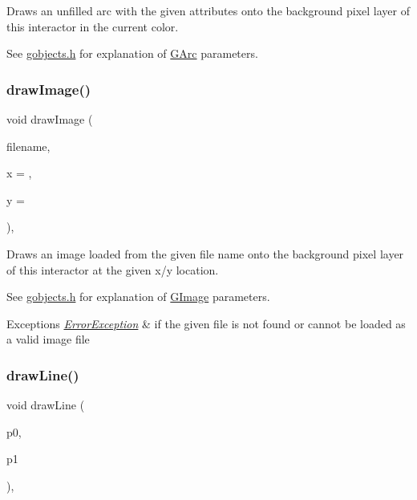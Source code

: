 Draws an unfilled arc with the given attributes onto the background pixel layer of this interactor in the current color. 

See \mbox{\hyperlink{gobjects_8h_source}{gobjects.\+h}} for explanation of \mbox{\hyperlink{classGArc}{G\+Arc}} parameters. \mbox{\label{classGDrawingSurface_abdd4cb1f2c64adc5d03522a1ee30febf}} 
\subsubsection{\texorpdfstring{draw\+Image()}{drawImage()}}
{\footnotesize\ttfamily void draw\+Image (\begin{DoxyParamCaption}\item[{const std\+::string \&}]{filename,  }\item[{double}]{x = {},  }\item[{double}]{y = {} }\end{DoxyParamCaption})\hspace{0.3cm}{\ttfamily [virtual]}, {\ttfamily [inherited]}}



Draws an image loaded from the given file name onto the background pixel layer of this interactor at the given x/y location. 

See \mbox{\hyperlink{gobjects_8h_source}{gobjects.\+h}} for explanation of \mbox{\hyperlink{classGImage}{G\+Image}} parameters. 
\begin{DoxyExceptions}{Exceptions}
{\em \mbox{\hyperlink{classErrorException}{Error\+Exception}}} & if the given file is not found or cannot be loaded as a valid image file \\
\hline
\end{DoxyExceptions}
\mbox{\label{classGDrawingSurface_ae6a24b6b9a6e795d3165c1c750d5bdf1}} 
\subsubsection{\texorpdfstring{draw\+Line()}{drawLine()}\hspace{0.1cm}{\footnotesize\ttfamily [1/2]}}
{\footnotesize\ttfamily void draw\+Line (\begin{DoxyParamCaption}\item[{const \mbox{\hyperlink{classGPoint}{G\+Point}} \&}]{p0,  }\item[{const \mbox{\hyperlink{classGPoint}{G\+Point}} \&}]{p1 }\end{DoxyParamCaption})\hspace{0.3cm}{\ttfamily [virtual]}, {\ttfamily [inherited]}}



